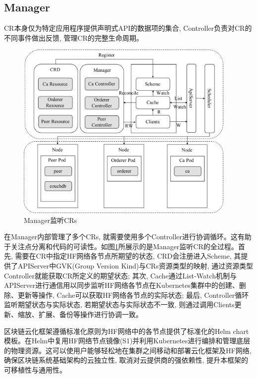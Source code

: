 \subsection{Manager}

CR本身仅为特定应用程序提供声明式API的数据项的集合, Controller负责对CR的不同事件做出反馈, 管理CR的完整生命周期。

\begin{figure}[h] %
    \centering %
    \includegraphics[width=0.95\textwidth]{FIGs/chapter4/manager.pdf} %
    \caption{Manager监听CRs} %
    \label{manager} %
\end{figure}%

在Manager内部管理了多个CRs, 就需要使用多个Controller进行协调循环。这有助于关注点分离和代码的可读性。如图\ref{manager}所展示的是Manager监听CR的全过程。首先, 需要在CR中指定HF网络各节点所期望的状态, CRD会注册进入Scheme, 其提供了APIServer中GVK(Group Version Kind)与CRs资源类型的映射, 通过资源类型Controller就能获取CR所定义的期望状态; 其次, Cache通过List-Watch机制与APIServer进行通信用以同步监听HF网络各节点在Kubernetes集群中的创建、删除、更新等操作, Cache可以获取HF网络各节点的实际状态; 最后, Controller循环监听期望状态与实际状态, 若期望状态与实际状态不一致, 则通过调用Clients更新、缩放、扩展、备份等操作进行协调一致。

区块链云化框架遵循标准化原则为HF网络中的各节点提供了标准化的Helm chart模板。在Helm中复用HF网络节点镜像(S1)并利用Kubernetes进行编排和管理底层的物理资源。这可以使用户能够轻松地在集群之间移动和部署云化框架及HF网络, 确保区块链系统基础架构的云独立性, 取消对云提供商的强依赖性, 提升本框架的可移植性与通用性。

